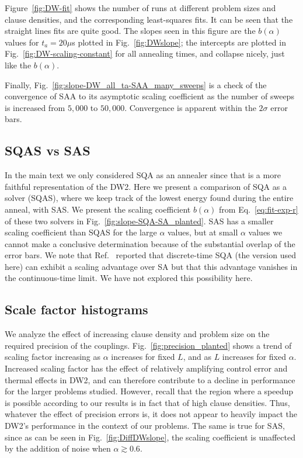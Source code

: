 Figure~\ref{fig:DW-fit} shows the number of runs at different problem sizes and clause densities, and the corresponding least-squares fits. It can be seen that the straight lines fits are quite good. The slopes seen in this figure are the $b(\alpha)$ values for $t_a=20\mu$s plotted in Fig.~\ref{fig:DWslope}; the intercepts are plotted in Fig.~\ref{fig:DW-scaling-constant} for all annealing times, and collapse nicely, just like the $b(\alpha)$.

Finally, Fig.~\ref{fig:slope-DW_all_ta-SAA_many_sweeps} is a check of the convergence of SAA to its asymptotic scaling coefficient as the number of sweeps is increased from $5,000$ to $50,\!000$. Convergence is apparent within the $2\sigma$ error bars.

\subsection{SQAS vs SAS} \label{sec:SQASSASscaling}
%
In the main text we only considered SQA as an annealer since that is a more faithful representation of the DW2.  Here we present a comparison of SQA as a solver (SQAS), where we keep track of the lowest energy found during the entire anneal, with SAS.  We present the scaling coefficient $b(\alpha)$ from Eq.~\eqref{eq:fit-exp-r} of these two solvers in Fig.~\ref{fig:slope-SQA-SA_planted}.   SAS has a smaller scaling coefficient than SQAS for the large $\alpha$ values, but at small $\alpha$ values we cannot make a conclusive determination because of the substantial overlap of the error bars.  We note that Ref.~\cite{Heim:2014jf} reported that discrete-time SQA (the version used here) can exhibit a scaling advantage over SA but that this advantage vanishes in the continuous-time limit.  We have not explored this possibility here.
%

\subsection{Scale factor histograms}
\label{sec:precision}

We analyze the effect of increasing clause density and problem size on the required precision of the couplings. Fig.~\ref{fig:precision_planted} shows a trend of scaling factor increasing as $\alpha$ increases for fixed $L$, and as $L$ increases for fixed $\alpha$. Increased scaling factor has the effect of relatively amplifying control error and thermal effects in DW2, and can therefore contribute to a decline in performance for the larger problems studied.
However, recall that the region where a speedup is possible according to our results is in fact that of high clause densities. Thus, whatever the effect of precision errors is, it does not appear to heavily impact the DW2's performance in the context of our problems. The same is true for SAS, since as can be seen in Fig.~\ref{fig:DiffDWslope}, the scaling coefficient is unaffected by the addition of noise when $\alpha \gtrsim 0.6$.

